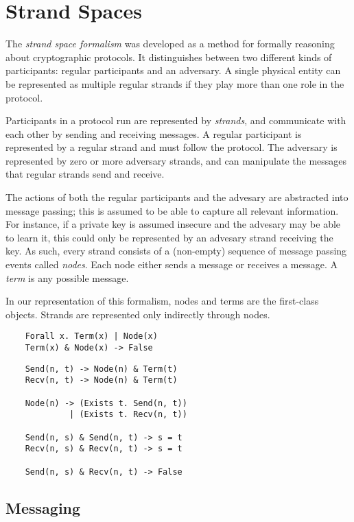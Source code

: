 \documentclass[12pt]{article}
\begin{document}
\section{Strand Spaces}

The \emph{strand space formalism} was developed as a method for
formally reasoning about cryptographic protocols. It distinguishes
between two different kinds of participants: regular participants and
an adversary. A single physical entity can be represented as multiple
regular strands if they play more than one role in the protocol.

Participants in a protocol run are represented by \emph{strands}, and
communicate with each other by sending and receiving messages. A
regular participant is represented by a regular strand and must follow
the protocol. The adversary is represented by zero or more adversary
strands, and can manipulate the messages that regular strands
send and receive.

The actions of both the regular participants and the advesary are
abstracted into message passing; this is assumed to be able to capture
all relevant information. For instance, if a private key is assumed
insecure and the advesary may be able to learn it, this could only be
represented by an advesary strand receiving the key. As such, every
strand consists of a (non-empty) sequence of message passing events
called \emph{nodes}. Each node either sends a message or receives a
message. A \emph{term} is any possible message.

In our representation of this formalism, nodes and terms are the
first-class objects. Strands are represented only indirectly through
nodes.

\begin{verbatim}
    Forall x. Term(x) | Node(x)
    Term(x) & Node(x) -> False
\end{verbatim}

\begin{verbatim}
    Send(n, t) -> Node(n) & Term(t)
    Recv(n, t) -> Node(n) & Term(t)

    Node(n) -> (Exists t. Send(n, t))
             | (Exists t. Recv(n, t))

    Send(n, s) & Send(n, t) -> s = t
    Recv(n, s) & Recv(n, t) -> s = t

    Send(n, s) & Recv(n, t) -> False
\end{verbatim}

\subsection{Messaging}
\end{document}

